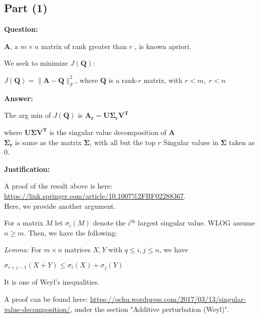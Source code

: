 \documentclass[fleqn, 11pt]{article}
\newcommand{\bs}[1]{\boldsymbol{#1}}
\begin{document}
\subsection*{Part (1)}

\textbf{Question: }

\smallskip

$\boldsymbol{A}$, a $m \times n$ matrix of rank greater than $r$ , is known apriori.

\smallskip

We seek to minimize $J(\boldsymbol{Q})$:
\begin{center}
    $J(\boldsymbol{Q}) = \|\boldsymbol{A}-\boldsymbol{Q}\|^2_F$, where $\boldsymbol{Q}$ is a rank-$r$ matrix, with $r < m, \; r < n$
\end{center}
\hrulefill

\medskip

\textbf{Answer: }

\medskip

The arg min of $J(\boldsymbol{Q})$ is $\bs{A_r=U \Sigma_r V^T}$ 

\smallskip

where $\bs{U \Sigma V^T}$ is the singular value decomposition of $\bs{A}$ \\
$\bs{\Sigma_r} $ is same as the matrix
$\bs{\Sigma} $, with all but the top $r$ Singular values in $\bs{\Sigma}$ taken as 0.

\hrulefill

\medskip

\textbf{Justification: }

A proof of the result above is here: \url{https://link.springer.com/article/10.1007\%2FBF02288367}. \\
Here, we provide another argument.

\medskip

For a matrix $M$ let $\sigma_i(M)$ denote the $i^{\text{th}}$ largest singular value.
WLOG assume $n \geq  m$.
Then, we have the following: 

\textit{Lemma: } For $m \times n$ matrices $X,Y$ with $q \leq i, j \leq n$, 
we have
\begin{center}
   $ \sigma_{i+j - 1}(X + Y) \leq \sigma_i(X) + \sigma_j(Y) $
\end{center}

It is one of Weyl's inequalities. 

A proof can be found here: \url{https://qchu.wordpress.com/2017/03/13/singular-value-decomposition/}, 
under the section "Additive perturbation (Weyl)". 
\end{document}
